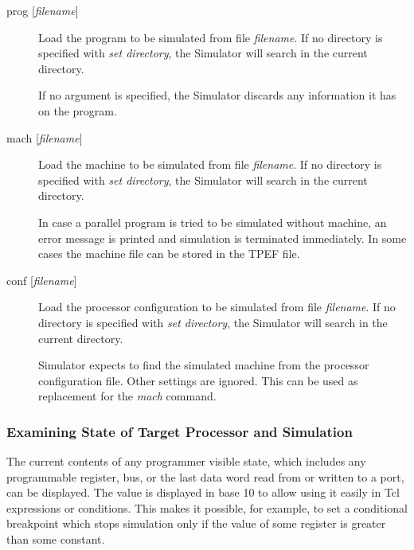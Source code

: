 \documentclass[twoside]{tceusermanual}
\begin{document}
\begin{description}
\item[prog {[\emph{filename}]}]%
  Load the program to be simulated from file \emph{filename}.  If no
  directory is specified with \emph{set directory}, the Simulator will
  search in the current directory.

  If no argument is specified, the Simulator discards any information it has
  on the program.

\item[mach {[\emph{filename}]}]%
  Load the machine to be simulated from file \emph{filename}.  If no
  directory is specified with \emph{set directory}, the Simulator will
  search in the current directory.

  In case a parallel program is tried to be simulated without machine,
  an error message is printed and simulation is terminated immediately.
  In some cases the machine file can be stored in the TPEF file.

\item[conf {[\emph{filename}]}]%
  Load the processor configuration to be simulated from file \emph{filename}.
  If no directory is specified with \emph{set directory}, the Simulator will
  search in the current directory.

  Simulator expects to find the simulated machine from the processor 
  configuration file. Other settings are ignored. This can be used as
  replacement for the \emph{mach} command.

\end{description}

\subsubsection{Examining State of Target Processor and Simulation}
\label{ssec:debug-state}

The current contents of any programmer visible state, which includes any
programmable register, bus, or the last data word read from or written to a
port, can be displayed. The value is displayed in base 10 to allow using it
easily in Tcl expressions or conditions. This makes it possible, for
example, to set a conditional breakpoint which stops simulation only if the
value of some register is greater than some constant.
\end{document}
